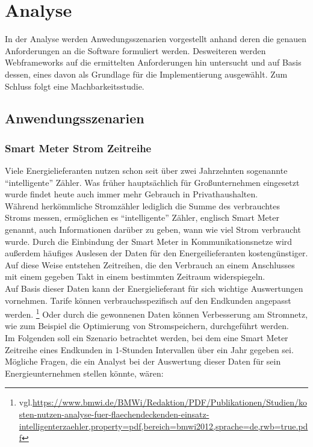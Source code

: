 \documentclass[12pt]{article}
\begin{document}
	\newpage	
		
\section{Analyse}
	In der Analyse werden Anwedungsszenarien vorgestellt anhand deren die genauen
	Anforderungen an die Software formuliert werden. Desweiteren werden
	Webframeworks auf die ermittelten Anforderungen hin untersucht und auf Basis
	dessen, eines davon als Grundlage für die Implementierung ausgewählt. Zum
	Schluss folgt eine Machbarkeitsstudie.

	\subsection{Anwendungsszenarien}
		\subsubsection{Smart Meter Strom Zeitreihe}
			Viele Energielieferanten nutzen schon seit über zwei Jahrzehnten sogenannte
			"`intelligente"' Zähler. Was früher hauptsächlich für Großunternehmen
			eingesetzt wurde findet heute auch immer mehr Gebrauch in
			Privathaushalten.\\[0.3cm]
			Während herkömmliche Stromzähler lediglich die Summe des verbrauchtes Stroms
			messen, ermöglichen es "`intelligente"' Zähler, englisch Smart Meter
			genannt, auch Informationen darüber zu geben, wann wie viel Strom verbraucht
			wurde. Durch die Einbindung der Smart Meter in Kommunikationsnetze wird
			außerdem häufiges Auslesen der Daten für den Energeilieferanten
			kostengünstiger. Auf diese Weise entstehen Zeitreihen, die den Verbrauch
			an einem Anschlusses mit einem gegeben Takt in einem bestimmten Zeitraum
			widerspiegeln.\\[0.3cm]
			Auf Basis dieser Daten kann der Energielieferant für sich wichtige
			Auswertungen vornehmen. Tarife können verbrauchsspezifisch auf den Endkunden
			angepasst werden.
			\footnote{vgl.\url{https://www.bmwi.de/BMWi/Redaktion/PDF/Publikationen/Studien/kosten-nutzen-analyse-fuer-flaechendeckenden-einsatz-intelligenterzaehler,property=pdf,bereich=bmwi2012,sprache=de,rwb=true.pdf}}
			Oder durch die gewonnenen Daten können Verbesserung am Stromnetz, wie
			zum Beispiel die Optimierung von Stromspeichern, durchgeführt
			werden.\\[0.3cm]
			Im Folgenden soll ein Szenario betrachtet werden, bei dem eine Smart Meter
			Zeitreihe eines Endkunden in 1-Stunden Intervallen über ein Jahr gegeben
			sei. Mögliche Fragen, die ein Analyst bei der Auswertung dieser Daten für
			sein Energieunternehmen stellen könnte, wären:
			
\end{document}
